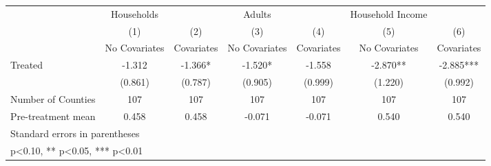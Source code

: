 {
\def\sym#1{\ifmmode^{#1}\else\(^{#1}\)\fi}
\begin{tabular}{l*{6}{c}}
\hline\hline
            &  Households   &               &      Adults   &               &Household Income   &               \\
            &\multicolumn{1}{c}{(1)}&\multicolumn{1}{c}{(2)}&\multicolumn{1}{c}{(3)}&\multicolumn{1}{c}{(4)}&\multicolumn{1}{c}{(5)}&\multicolumn{1}{c}{(6)}\\
            &\multicolumn{1}{c}{No Covariates}&\multicolumn{1}{c}{Covariates}&\multicolumn{1}{c}{No Covariates}&\multicolumn{1}{c}{Covariates}&\multicolumn{1}{c}{No Covariates}&\multicolumn{1}{c}{Covariates}\\
\hline
Treated     &      -1.312   &      -1.366*  &      -1.520*  &      -1.558   &      -2.870** &      -2.885***\\
            &     (0.861)   &     (0.787)   &     (0.905)   &     (0.999)   &     (1.220)   &     (0.992)   \\
\hline
Number of Counties&         107   &         107   &         107   &         107   &         107   &         107   \\
Pre-treatment mean&       0.458   &       0.458   &      -0.071   &      -0.071   &       0.540   &       0.540   \\
\hline\hline
\multicolumn{7}{l}{\footnotesize Standard errors in parentheses}\\
\multicolumn{7}{l}{\footnotesize * p<0.10, ** p<0.05, *** p<0.01}\\
\end{tabular}
}
